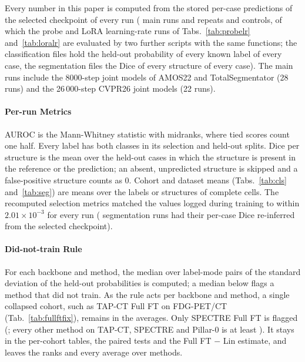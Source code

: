 Every number in this paper is computed from the stored per-case predictions of the selected checkpoint of every run (\numRunsMainN{} main runs and \numRunsRevisionAllN{} repeats and controls, of which the \numProbelrRunsN{} probe and \numLoralrRunsN{} LoRA learning-rate runs of Tabs.~\ref{tab:probelr} and~\ref{tab:loralr} are evaluated by two further scripts with the same functions; the classification files hold the held-out probability of every known label of every case, the segmentation files the Dice of every structure of every case). The \numRunsMainN{} main runs include the 8000-step joint models of AMOS22 and TotalSegmentator (28 runs) and the 26\,000-step CVPR26 joint models (22 runs).

\paragraph{Per-run Metrics} AUROC is the Mann-Whitney statistic with midranks, where tied scores count one half. Every label has both classes in its selection and held-out splits. Dice per structure is the mean over the held-out cases in which the structure is present in the reference or the prediction; an absent, unpredicted structure is skipped and a false-positive structure counts as 0. Cohort and dataset means (Tabs.~\ref{tab:cls} and~\ref{tab:seg}) are means over the labels or structures of complete cells. The recomputed selection metrics matched the values logged during training to within $2.01\times10^{-3}$ for every run (\numSegrecompRunsN{} segmentation runs had their per-case Dice re-inferred from the selected checkpoint).

\paragraph{Did-not-train Rule} For each backbone and method, the median over label-mode pairs of the standard deviation of the held-out probabilities is computed; a median below \numSpreadMinValue{} flags a method that did not train. As the rule acts per backbone and method, a single collapsed cohort, such as TAP-CT Full FT on FDG-PET/CT (Tab.~\ref{tab:fullftfix}), remains in the averages. Only SPECTRE Full FT is flagged (\numSpreadSpectreFullft{}; every other method on TAP-CT, SPECTRE and Pillar-0 is at least \numSpreadOthermin{}). It stays in the per-cohort tables, the paired tests and the Full FT $-$ Lin estimate, and leaves the ranks and every average over methods.

